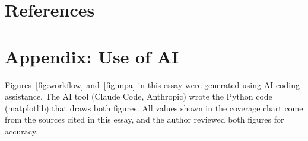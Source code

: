 \documentclass[12pt,letterpaper]{article}
\begin{document}
\clearpage
\section*{References}
\label{sec:references}
\printbibliography[heading=none]

\clearpage
\section*{Appendix: Use of AI}
\label{sec:appendix}
Figures~\ref{fig:workflow} and~\ref{fig:mpa} in this essay were generated using AI coding assistance. The AI tool
(Claude Code, Anthropic) wrote the Python code (matplotlib) that draws both
figures. All values shown in the coverage chart come from the sources cited in
this essay, and the author reviewed both figures for accuracy.
\end{document}
